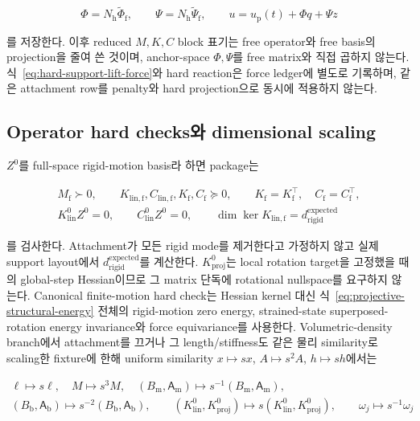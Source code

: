 \documentclass[11pt,a4paper]{article}
\begin{document}
\begin{equation}
  \Phi=N_{\mathrm h}\widetilde\Phi_{\mathrm f},
  \qquad
  \Psi=N_{\mathrm h}\widetilde\Psi_{\mathrm f},
  \qquad
  u=u_{\mathrm p}(t)+\Phi q+\Psi z
  \label{eq:hard-attachment-basis-lift}
\end{equation}

를 저장한다.
이후 reduced \(M,K,C\) block 표기는 free operator와 free basis의 projection을 줄여 쓴 것이며,
anchor-space \(\Phi,\Psi\)를 free matrix와 직접 곱하지 않는다.
식~\eqref{eq:hard-support-lift-force}와 hard reaction은 force ledger에 별도로 기록하며,
같은 attachment row를 penalty와 hard projection으로 동시에 적용하지 않는다.

\subsection{Operator hard checks와 dimensional scaling}

\(Z^0\)를 full-space rigid-motion basis라 하면 package는

\begin{equation}
\begin{gathered}
  M_{\mathrm f}\succ0,
  \qquad K_{\mathrm{lin,f}},C_{\mathrm{lin,f}},K_{\mathrm f},C_{\mathrm f}\succeq0,
  \qquad K_{\mathrm f}=K_{\mathrm f}^\top,
  \quad C_{\mathrm f}=C_{\mathrm f}^\top,\\
  K_{\mathrm{lin}}^0Z^0=0,
  \qquad C_{\mathrm{lin}}^0Z^0=0,
  \qquad
  \dim\ker K_{\mathrm{lin,f}}=d_{\mathrm{rigid}}^{\mathrm{expected}}
  \label{eq:operator-construction-hard-checks}
\end{gathered}
\end{equation}

를 검사한다.
Attachment가 모든 rigid mode를 제거한다고 가정하지 않고 실제 support layout에서
\(d_{\mathrm{rigid}}^{\mathrm{expected}}\)를 계산한다.
\(K_{\mathrm{proj}}^0\)는 local rotation target을 고정했을 때의 global-step Hessian이므로
그 matrix 단독에 rotational nullspace를 요구하지 않는다.
Canonical finite-motion hard check는 Hessian kernel 대신
식~\eqref{eq:projective-structural-energy} 전체의 rigid-motion zero energy,
strained-state superposed-rotation energy invariance와 force equivariance를 사용한다.
Volumetric-density branch에서 attachment를 끄거나 그 length/stiffness도 같은 물리 similarity로
scaling한 fixture에 한해
uniform similarity \(x\mapsto sx\), \(A\mapsto s^2A\), \(h\mapsto sh\)에서는

\begin{equation}
\begin{gathered}
  \ell\mapsto s\ell,
  \quad M\mapsto s^3M,
  \quad (B_{\mathrm m},\mathsf A_{\mathrm m})\mapsto
  s^{-1}(B_{\mathrm m},\mathsf A_{\mathrm m}),\\
  (B_{\mathrm b},\mathsf A_{\mathrm b})\mapsto
  s^{-2}(B_{\mathrm b},\mathsf A_{\mathrm b}),\qquad
  (K_{\mathrm{lin}}^0,K_{\mathrm{proj}}^0)\mapsto
  s(K_{\mathrm{lin}}^0,K_{\mathrm{proj}}^0),
  \qquad \omega_j\mapsto s^{-1}\omega_j
  \label{eq:operator-dimensional-scaling}
\end{gathered}
\end{equation}
\end{document}
